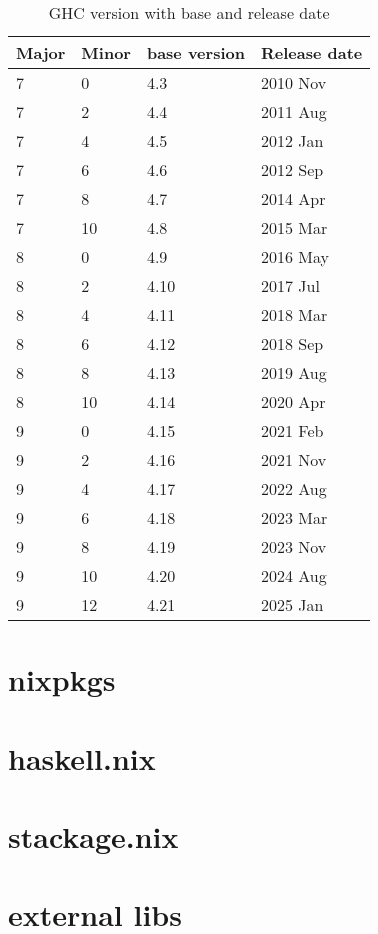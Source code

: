 \documentclass[openany, 12pt]{book}
\begin{document}
\begin{table}[h]
	\centering
	\begin{tabular}{llll}
		\toprule
		Major & Minor & base version & Release date \\
		\midrule
		7     & 0     & 4.3          & 2010 Nov     \\
		7     & 2     & 4.4          & 2011 Aug     \\
		7     & 4     & 4.5          & 2012 Jan     \\
		7     & 6     & 4.6          & 2012 Sep     \\
		7     & 8     & 4.7          & 2014 Apr     \\
		7     & 10    & 4.8          & 2015 Mar     \\
		8     & 0     & 4.9          & 2016 May     \\
		8     & 2     & 4.10         & 2017 Jul     \\
		8     & 4     & 4.11         & 2018 Mar     \\
		8     & 6     & 4.12         & 2018 Sep     \\
		8     & 8     & 4.13         & 2019 Aug     \\
		8     & 10    & 4.14         & 2020 Apr     \\
		9     & 0     & 4.15         & 2021 Feb     \\
		9     & 2     & 4.16         & 2021 Nov     \\
		9     & 4     & 4.17         & 2022 Aug     \\
		9     & 6     & 4.18         & 2023 Mar     \\
		9     & 8     & 4.19         & 2023 Nov     \\
		9     & 10    & 4.20         & 2024 Aug     \\
		9     & 12    & 4.21         & 2025 Jan     \\
		\bottomrule
	\end{tabular}
	\caption{GHC version with base and release date}
\end{table}

\chapter{nixpkgs}
\chapter{haskell.nix}
\chapter{stackage.nix}
\chapter{external libs}

\clearpage
\printglossaries

\printindex{}
\end{document}

